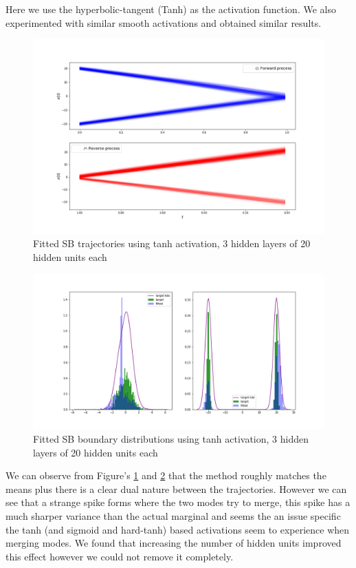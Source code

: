 \documentclass[a4paper,12pt,twoside,openright]{report}
\theoremstyle{definition}
\begin{document}
Here we use the hyperbolic-tangent (Tanh) as the activation function. We also experimented with similar smooth activations and obtained similar results.
\begin{figure}
    \centering
    \includegraphics[scale=0.4,trim={2.3cm 1cm 2.5cm 0}, clip]{images/Control/bimodal_marginals_best_tanh_trajectories.png}
    \caption{ Fitted SB  trajectories using tanh activation, 3 hidden layers of 20 hidden units each}
    \label{fig:trajectoriesbimodtanhnn}
\end{figure}
\begin{figure}
    \centering
    \includegraphics[scale=0.4,trim={2.3cm 1cm 2.5cm 0}, clip]{images/Control/bimodal_marginals_best_tanh.png}
    \caption{ Fitted SB  boundary distributions using tanh activation, 3 hidden layers of 20 hidden units each}
    \label{fig:boundsbimodtanhnn}
\end{figure}
We can observe from Figure's \ref{fig:trajectoriesbimodtanhnn} and \ref{fig:boundsbimodtanhnn} that the method roughly matches the means plus there is a clear dual nature between the trajectories. However we can see that a strange spike forms where the two modes try to merge, this spike has a much sharper variance than the actual marginal and seems the an issue specific the tanh (and sigmoid and hard-tanh) based activations seem to experience when merging modes. We found that increasing the number of hidden units improved this effect however we could not remove it completely. 
\end{document}
